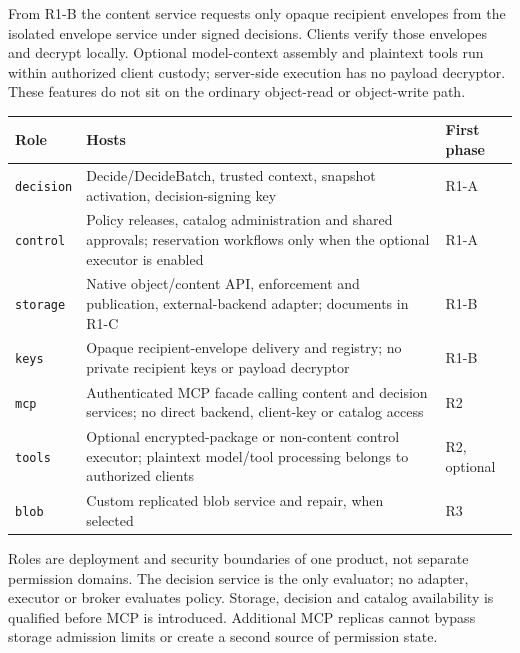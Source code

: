 \documentclass[11pt,a4paper]{article}
\newcommand{\code}[1]{{\small\nolinkurl{#1}}}
\begin{document}
From R1-B the content service requests only opaque recipient envelopes from the isolated envelope service under signed decisions. Clients verify those envelopes and decrypt locally. Optional model-context assembly and plaintext tools run within authorized client custody; server-side execution has no payload decryptor. These features do not sit on the ordinary object-read or object-write path.
\begin{longtable}{@{}P{0.14\textwidth}P{0.56\textwidth}P{0.14\textwidth}@{}}
\toprule Role & Hosts & First phase\\\midrule\endhead
\code{decision} & Decide/DecideBatch, trusted context, snapshot activation, decision-signing key & R1-A\\
\code{control} & Policy releases, catalog administration and shared approvals; reservation workflows only when the optional executor is enabled & R1-A\\
\code{storage} & Native object/content API, enforcement and publication, external-backend adapter; documents in R1-C & R1-B\\
\code{keys} & Opaque recipient-envelope delivery and registry; no private recipient keys or payload decryptor & R1-B\\
\code{mcp} & Authenticated MCP facade calling content and decision services; no direct backend, client-key or catalog access & R2\\
\code{tools} & Optional encrypted-package or non-content control executor; plaintext model/tool processing belongs to authorized clients & R2, optional\\
\code{blob} & Custom replicated blob service and repair, when selected & R3\\
\bottomrule
\end{longtable}
Roles are deployment and security boundaries of one product, not separate permission domains. The decision service is the only evaluator; no adapter, executor or broker evaluates policy. Storage, decision and catalog availability is qualified before MCP is introduced. Additional MCP replicas cannot bypass storage admission limits or create a second source of permission state.
\end{document}

